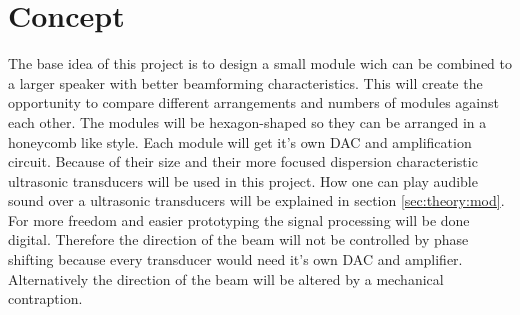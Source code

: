 \chapter{Concept}\label{sec:concept}


The base idea of this project is to design a small module wich can be combined to a larger speaker with better beamforming characteristics. This will create the opportunity to compare different arrangements and numbers of modules against each other. The modules will be hexagon-shaped so they can be arranged in a honeycomb like style. Each module will get it's own DAC and amplification circuit.\p
Because of their size and their more focused dispersion characteristic ultrasonic transducers will be used in this project. How one can play audible sound over a ultrasonic transducers will be explained in section \ref{sec:theory:mod}.\p
For more freedom and easier prototyping the signal processing will be done digital. Therefore the direction of the beam will not be controlled by phase shifting because every transducer would need it's own DAC and amplifier. Alternatively the direction of the beam will be altered by a mechanical contraption.